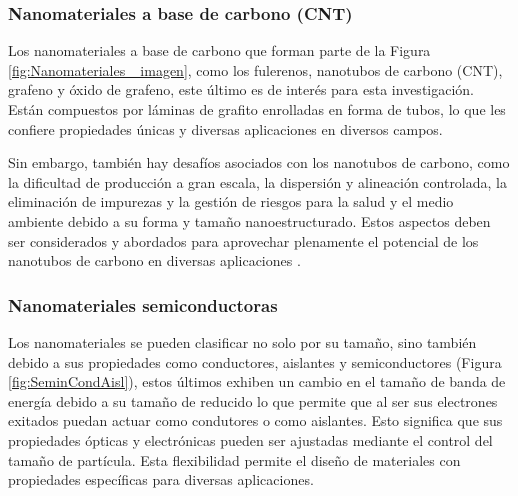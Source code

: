 \documentclass[12pt]{article}
\begin{document}
     
     \subsubsection{Nanomateriales a base de carbono (CNT)}
     Los nanomateriales a base de carbono que forman parte de la Figura \ref{fig:Nanomateriales_ imagen}, como los fulerenos, nanotubos de carbono (CNT), grafeno y óxido de grafeno, este último es de interés para esta investigación. Están compuestos por láminas de grafito enrolladas en forma de tubos, lo que les confiere propiedades únicas y diversas aplicaciones en diversos campos.\vspace{1em} %


    Sin embargo, también hay desafíos asociados con los nanotubos de carbono, como la dificultad de producción a gran escala, la dispersión y alineación controlada, la eliminación de impurezas y la gestión de riesgos para la salud y el medio ambiente debido a su forma y tamaño nanoestructurado. Estos aspectos deben ser considerados y abordados para aprovechar plenamente el potencial de los nanotubos de carbono en diversas aplicaciones \cite{IEEEreferencias:GO_8,IEEEreferencias:GO_GOr}.

    \subsubsection{Nanomateriales semiconductoras}
    Los nanomateriales se pueden clasificar no solo por su tamaño, sino también debido a sus propiedades como conductores, aislantes y semiconductores (Figura \ref{fig:SeminCondAisl}), estos últimos exhiben un cambio en el tamaño de banda de energía debido a su tamaño de reducido lo que permite que al ser sus electrones exitados puedan actuar como condutores o como aislantes. Esto significa que sus propiedades ópticas y electrónicas pueden ser ajustadas mediante el control del tamaño de partícula. Esta flexibilidad permite el diseño de materiales con propiedades específicas para diversas aplicaciones.\vspace{1em} %
\end{document}
